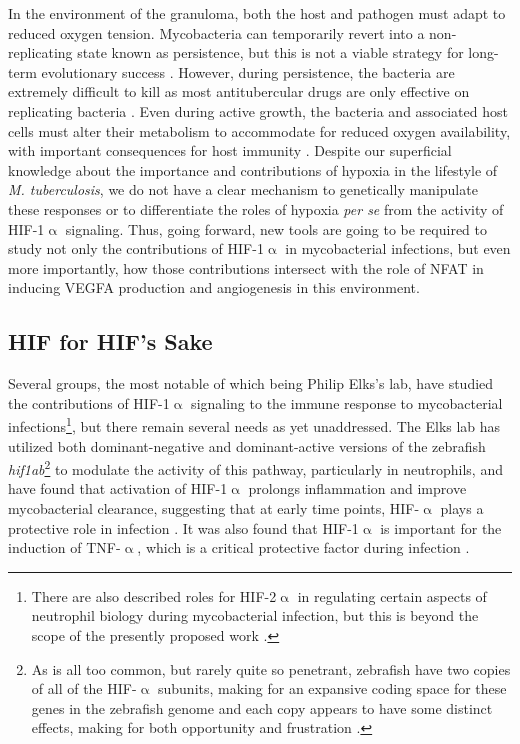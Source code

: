 In the environment of the granuloma, both the host and pathogen must adapt to reduced oxygen tension. Mycobacteria can temporarily revert into a non-replicating state known as persistence, but this is not a viable strategy for long-term evolutionary success \citep{Ehrt2018, Stewart2003, Manabe2000, Pandey2008, zuBentrup2001}. However, during persistence, the bacteria are extremely difficult to kill as most antitubercular drugs are only effective on replicating bacteria \citep{Veatch2018}. Even during active growth, the bacteria and associated host cells must alter their metabolism to accommodate for reduced oxygen availability, with important consequences for host immunity \citep{Harper2012, Tsai2006, Prosser2017, Rustad2009, Galagan2013}. Despite our superficial knowledge about the importance and contributions of hypoxia in the lifestyle of \textit{M. tuberculosis}, we do not have a clear mechanism to genetically manipulate these responses or to differentiate the roles of hypoxia \textit{per se} from the activity of HIF-1$\upalpha$ signaling. Thus, going forward, new tools are going to be required to study not only the contributions of HIF-1$\upalpha$ in mycobacterial infections, but even more importantly, how those contributions intersect with the role of NFAT in inducing VEGFA production and angiogenesis in this environment.

\subsection{HIF for HIF's Sake}

Several groups, the most notable of which being Philip Elks's lab, have studied the contributions of HIF-1$\upalpha$ signaling to the immune response to mycobacterial infections\footnote{There are also described roles for HIF-2$\upalpha$ in regulating certain aspects of neutrophil biology during mycobacterial infection, but this is beyond the scope of the presently proposed work \citep{Thompson2014, Elks2015}.}, but there remain several needs as yet unaddressed. The Elks lab has utilized both dominant-negative and dominant-active versions of the zebrafish \textit{hif1ab}\footnote{As is all too common, but rarely quite so penetrant, zebrafish have two copies of all of the HIF-$\upalpha$ subunits, making for an expansive coding space for these genes in the zebrafish genome and each copy appears to have some distinct effects, making for both opportunity and frustration \citep{Elks2015}.} to modulate the activity of this pathway, particularly in neutrophils, and have found that activation of HIF-1$\upalpha$ prolongs inflammation and improve mycobacterial clearance, suggesting that at early time points, HIF-$\upalpha$ plays a protective role in infection \citep{Elks2011, Elks2013, Hammond2020}. It was also found that HIF-1$\upalpha$ is important for the induction of TNF-$\upalpha$, which is a critical protective factor during infection \citep{Lewis2019, Flynn1995}. 

